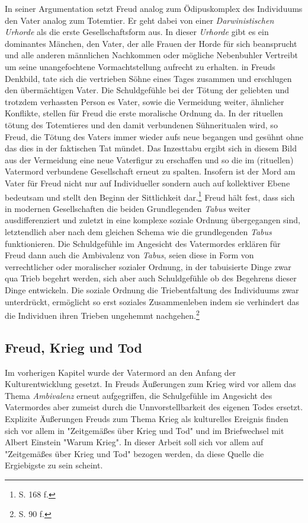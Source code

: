 \documentclass[11pt,a4paper,oneside,numbers=noenddot,bibliography=totocnumbered,DIV=13]{scrartcl}
\begin{document}
In seiner Argumentation setzt Freud analog zum Ödipuskomplex des Individuums den Vater analog zum Totemtier. Er geht dabei von einer \textit{Darwinistischen Urhorde} als die erste Gesellschaftsform aus. In dieser \textit{Urhorde} gibt es ein dominantes Mänchen, den Vater, der alle Frauen der Horde für sich beansprucht und alle anderen männlichen Nachkommen oder mögliche Nebenbuhler Vertreibt um seine unangefochtene Vormachtstellung aufrecht zu erhalten. in Freuds Denkbild, tate sich die vertrieben Söhne eines Tages zusammen und erschlugen den übermächtigen Vater. Die Schuldgefühle bei der Tötung der geliebten und trotzdem verhassten Person es Vater, sowie die Vermeidung weiter, ähnlicher Konflikte, stellen für Freud die erste moralische Ordnung da.
In der rituellen tötung des Totemtieres und den damit verbundenen Sühneritualen wird, so Freud, die Tötung des Vaters immer wieder aufs neue begangen und gesühnt ohne das dies in der faktischen Tat mündet. Das Inzesttabu ergibt sich in diesem Bild aus der Vermeidung eine neue Vaterfigur zu erschaffen und so die im (rituellen) Vatermord verbundene Gesellschaft erneut zu spalten.  Insofern ist der Mord am Vater für Freud nicht nur auf Individueller sondern auch auf kollektiver Ebene bedeutsam und stellt den Beginn der Sittlichkeit dar.\footnote{\cite{lohmann_freud-handbuch:_2013} S. 168 f.}
Freud hält fest, dass sich in modernen Gesellschaften die beiden Grundlegenden \textit{Tabus} weiter ausdifferenziert und zuletzt in eine komplexe soziale Ordnung übergegangen sind, letztendlich aber nach dem gleichen Schema wie die grundlegenden \textit{Tabus} funktionieren.    
Die Schuldgefühle im Angesicht des Vatermordes erklären für Freud dann auch die Ambivalenz von \textit{Tabus}, seien diese in Form von verrechtlicher oder moralischer sozialer Ordnung, in der tabuisierte Dinge zwar qua Trieb begehrt werden, sich aber auch Schuldgefühle ob des Begehrens dieser Dinge entwickeln. Die soziale Ordnung die Triebentfaltung des Individuums zwar unterdrückt, ermöglicht so erst soziales Zusammenleben indem sie verhindert das die Individuen ihren Trieben ungehemmt nachgehen.\footnote{\cite{berkel_sigmund_2008} S. 90 f.}     
\subsection{Freud, Krieg und Tod}
Im vorherigen Kapitel wurde der Vatermord an den Anfang der Kulturentwicklung gesetzt. In Freuds Äußerungen zum Krieg wird vor allem das Thema \textit{Ambivalenz} erneut aufgegriffen, die Schulgefühle im Angesicht des Vatermordes aber zumeist durch die Unnvorstellbarkeit des eigenen Todes ersetzt.\\
Explizite Äußerungen Freuds zum Thema Krieg als kulturelles Ereignis finden sich vor allem in "Zeitgemäßes über Krieg und Tod" und im Briefwechsel mit Albert Einstein "Warum Krieg". In dieser Arbeit soll sich vor allem auf "Zeitgemäßes über Krieg und Tod" bezogen werden, da diese Quelle die Ergiebigste zu sein scheint.
\end{document}
